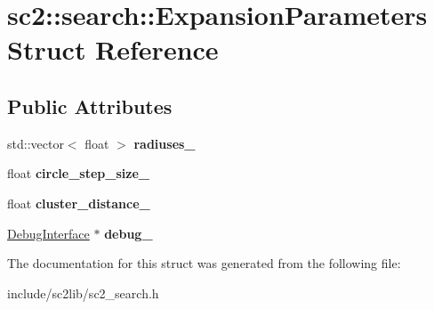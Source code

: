 \hypertarget{structsc2_1_1search_1_1_expansion_parameters}{}\section{sc2\+:\+:search\+:\+:Expansion\+Parameters Struct Reference}
\label{structsc2_1_1search_1_1_expansion_parameters}
\subsection*{Public Attributes}
\begin{DoxyCompactItemize}
\item 
\mbox{\label{structsc2_1_1search_1_1_expansion_parameters_ab0f8373fa330a60ad44331b650c1a883}} 
std\+::vector$<$ float $>$ {\bfseries radiuses\+\_\+}
\item 
\mbox{\label{structsc2_1_1search_1_1_expansion_parameters_a6e301d0f912425324b5065269fac8f0e}} 
float {\bfseries circle\+\_\+step\+\_\+size\+\_\+}
\item 
\mbox{\label{structsc2_1_1search_1_1_expansion_parameters_ac18969401e33a2acfe7d2582ed0e6f99}} 
float {\bfseries cluster\+\_\+distance\+\_\+}
\item 
\mbox{\label{structsc2_1_1search_1_1_expansion_parameters_a203a4dece9a00ac7d893bf894d79199a}} 
\hyperlink{classsc2_1_1_debug_interface}{Debug\+Interface} $\ast$ {\bfseries debug\+\_\+}
\end{DoxyCompactItemize}


The documentation for this struct was generated from the following file\+:\begin{DoxyCompactItemize}
\item 
include/sc2lib/sc2\+\_\+search.\+h\end{DoxyCompactItemize}
